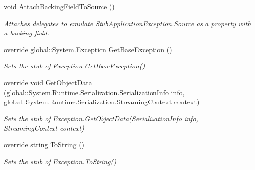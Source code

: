\begin{DoxyCompactItemize}
void \hyperlink{class_system_1_1_fakes_1_1_stub_application_exception_afa68648023832329ae75620f881a271d}{Attach\-Backing\-Field\-To\-Source} ()
\begin{DoxyCompactList}\small\item\em Attaches delegates to emulate \hyperlink{class_system_1_1_fakes_1_1_stub_application_exception_aa483f84cda001e4426bddd09602d7f44}{Stub\-Application\-Exception.\-Source} as a property with a backing field.\end{DoxyCompactList}\item 
override global\-::\-System.\-Exception \hyperlink{class_system_1_1_fakes_1_1_stub_application_exception_a2c1834f9f9b41403d2333936c36a4ed2}{Get\-Base\-Exception} ()
\begin{DoxyCompactList}\small\item\em Sets the stub of Exception.\-Get\-Base\-Exception()\end{DoxyCompactList}\item 
override void \hyperlink{class_system_1_1_fakes_1_1_stub_application_exception_a3ad301672a07ad1421ac734fdaaeee0d}{Get\-Object\-Data} (global\-::\-System.\-Runtime.\-Serialization.\-Serialization\-Info info, global\-::\-System.\-Runtime.\-Serialization.\-Streaming\-Context context)
\begin{DoxyCompactList}\small\item\em Sets the stub of Exception.\-Get\-Object\-Data(\-Serialization\-Info info, Streaming\-Context context)\end{DoxyCompactList}\item 
override string \hyperlink{class_system_1_1_fakes_1_1_stub_application_exception_aae90d576133627cedea6772fbf5c8436}{To\-String} ()
\begin{DoxyCompactList}\small\item\em Sets the stub of Exception.\-To\-String()\end{DoxyCompactList}\end{DoxyCompactItemize}
